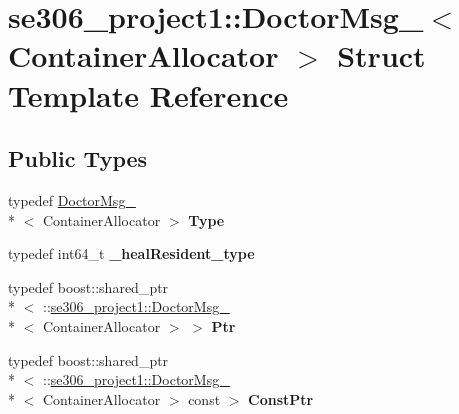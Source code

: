 \hypertarget{structse306__project1_1_1DoctorMsg__}{\section{se306\-\_\-project1\-:\-:Doctor\-Msg\-\_\-$<$ Container\-Allocator $>$ Struct Template Reference}
\label{structse306__project1_1_1DoctorMsg__}
}
\subsection*{Public Types}
\begin{DoxyCompactItemize}
\item 
\hypertarget{structse306__project1_1_1DoctorMsg___a00781357575cf134c091219ee53d0a94}{typedef \hyperlink{structse306__project1_1_1DoctorMsg__}{Doctor\-Msg\-\_\-}\\*
$<$ Container\-Allocator $>$ {\bfseries Type}}\label{structse306__project1_1_1DoctorMsg___a00781357575cf134c091219ee53d0a94}

\item 
\hypertarget{structse306__project1_1_1DoctorMsg___a0bf92f8b59acb2aa96b52e569e5817b1}{typedef int64\-\_\-t {\bfseries \-\_\-heal\-Resident\-\_\-type}}\label{structse306__project1_1_1DoctorMsg___a0bf92f8b59acb2aa96b52e569e5817b1}

\item 
\hypertarget{structse306__project1_1_1DoctorMsg___a8a5d1bbf5000de3e2d58770fc41be09d}{typedef boost\-::shared\-\_\-ptr\\*
$<$ \-::\hyperlink{structse306__project1_1_1DoctorMsg__}{se306\-\_\-project1\-::\-Doctor\-Msg\-\_\-}\\*
$<$ Container\-Allocator $>$ $>$ {\bfseries Ptr}}\label{structse306__project1_1_1DoctorMsg___a8a5d1bbf5000de3e2d58770fc41be09d}

\item 
\hypertarget{structse306__project1_1_1DoctorMsg___af7d7e47c79b0848918536b70a58a4a8e}{typedef boost\-::shared\-\_\-ptr\\*
$<$ \-::\hyperlink{structse306__project1_1_1DoctorMsg__}{se306\-\_\-project1\-::\-Doctor\-Msg\-\_\-}\\*
$<$ Container\-Allocator $>$ const  $>$ {\bfseries Const\-Ptr}}\label{structse306__project1_1_1DoctorMsg___af7d7e47c79b0848918536b70a58a4a8e}

\end{DoxyCompactItemize}

